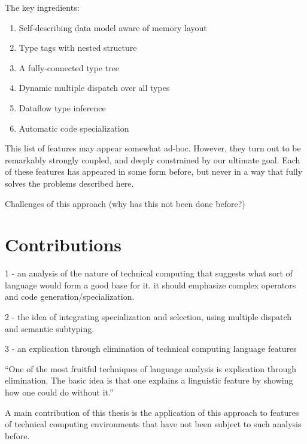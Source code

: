 



The key ingredients:

\begin{singlespace}
\begin{enumerate}
\item Self-describing data model aware of memory layout
\item Type tags with nested structure
\item A fully-connected type tree
\item Dynamic multiple dispatch over all types %
\item Dataflow type inference
\item Automatic code specialization
\end{enumerate}
\end{singlespace}

This list of features may appear somewhat ad-hoc. However, they turn out to be
remarkably strongly coupled, and deeply constrained by our ultimate goal.
Each of these features has appeared in some form before, but never in a way
that fully solves the problems described here.

Challenges of this approach (why has this not been done before?)


\section{Contributions}

1 - an analysis of the nature of technical computing that suggests what
sort of language would form a good base for it. it should emphasize
complex operators and code generation/specialization.

2 - the idea of integrating specialization and selection, using multiple dispatch
and semantic subtyping.

3 - an explication through elimination of technical computing language features

``One of the most fruitful techniques of language analysis is explication through
elimination. The basic idea is that one explains a linguistic feature by showing
how one could do without it.'' \cite{morris}

A main contribution of this thesis is the application of this approach to features
of technical computing environments that have not been subject to such analysis
before.
